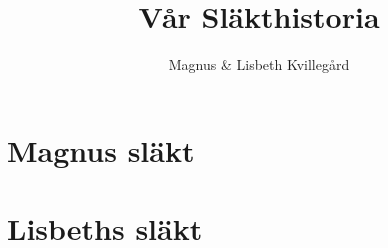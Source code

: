 \documentclass[11pt]{memoir}
\title{Vår Släkthistoria}
\author{Magnus \& Lisbeth Kvillegård}
\date{}
\begin{document}
\sloppybottom
    \frontmatter
    
        
        
        
        
        
        
    \mainmatter
		\part{Magnus släkt}
        
        
        \part{Lisbeths släkt}
        
    \backmatter
\end{document}

